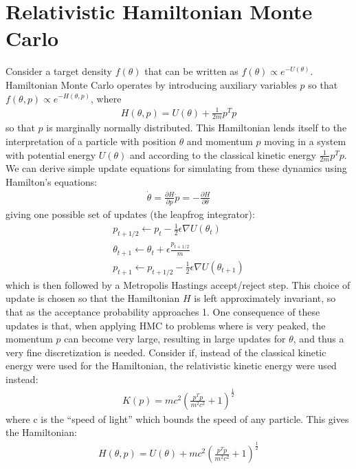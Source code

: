 \section{Relativistic Hamiltonian Monte Carlo}
Consider a target density $f(\theta)$ that can be written as $f(\theta) \propto e^{-U(\theta)}$. Hamiltonian Monte Carlo operates by introducing auxiliary variables $p$ so that $f(\theta, p) \propto e^{-H(\theta,p)}$, where
\begin{eqnarray}
H(\theta,p) = U(\theta) + \frac{1}{2m}p^Tp
\end{eqnarray}
so that $p$ is marginally normally distributed. This Hamiltonian lends itself to the interpretation of a particle with position $\theta$ and momentum $p$ moving in a system with potential energy $U(\theta)$ and according to the classical kinetic energy $\frac{1}{2m}p^Tp$. We can derive simple update
equations for simulating from these dynamics using Hamilton’s equations:
\begin{eqnarray}
\dot{\theta} = \frac{\partial H}{\partial p} \dot{p} = -\frac{\partial H}{\partial \theta}
\end{eqnarray}
giving one possible set of updates (the leapfrog integrator):
\begin{eqnarray}
p_{t+1/2} \leftarrow p_t -\frac{1}{2}\epsilon\nabla U(\theta_t)\\
\theta_{t+1} \leftarrow \theta_t + \epsilon \frac{p_{t+1/2}}{m}\\
p_{t+1} \leftarrow p_{t+1/2} -\frac{1}{2}\epsilon\nabla U(\theta_{t+1})
\end{eqnarray}
which is then followed by a Metropolis Hastings accept/reject step. This choice of update is chosen so that the Hamiltonian $H$ is left approximately invariant, so that as the
acceptance probability approaches 1.
One consequence of these updates is that, when applying HMC to problems where 
is very peaked, the momentum $p$ can become very large, resulting in large updates for $\theta$, and thus a very fine discretization is needed.
Consider if, instead of the classical kinetic energy were used for the Hamiltonian, the relativistic kinetic energy were used instead:
\begin{eqnarray}
K(p) = mc^2\left(\frac{p^Tp}{m^2c^2}+1\right)^{\frac{1}{2}}
\end{eqnarray}
where c is the “speed of light” which bounds the speed of any particle. This gives the Hamiltonian:
\begin{eqnarray}
H(\theta,p) = U(\theta) + mc^2\left(\frac{p^Tp}{m^2c^2}+1\right)^{\frac{1}{2}}
\end{eqnarray}
